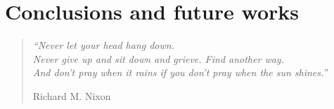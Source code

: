 \chapter{Conclusions and future works}
\label{cap7}

\begin{quotation}
{\footnotesize
\noindent\emph{``Never let your head hang down.\\
Never give up and sit down and grieve. Find another way.\\
And don't pray when it rains if you don't pray when the sun shines.''}
\begin{flushright}
Richard M. Nixon
\end{flushright}
}
\end{quotation}
\vspace{0.5cm}


